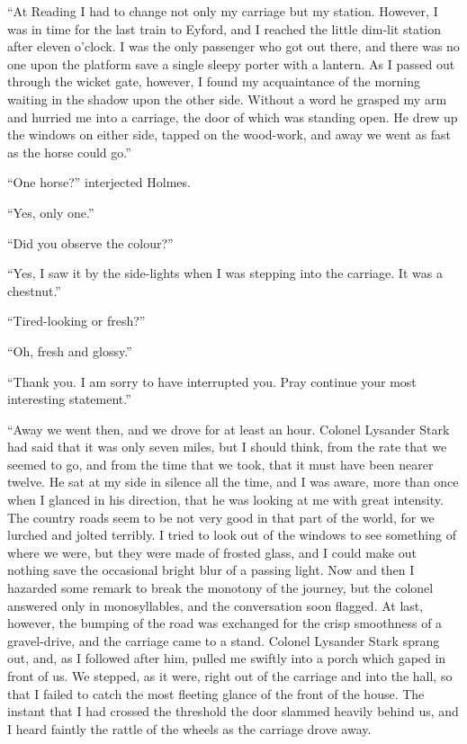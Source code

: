 \documentclass{article}
\begin{document}
``At Reading I had to change not only my carriage but my station. However,
I was in time for the last train to Eyford, and I reached the little
dim-lit station after eleven o'clock. I was the only passenger who got
out there, and there was no one upon the platform save a single sleepy
porter with a lantern. As I passed out through the wicket gate, however, I
found my acquaintance of the morning waiting in the shadow upon the other
side. Without a word he grasped my arm and hurried me into a carriage, the
door of which was standing open. He drew up the windows on either side,
tapped on the wood-work, and away we went as fast as the horse could go.''

``One horse?'' interjected Holmes.

``Yes, only one.''

``Did you observe the colour?''

``Yes, I saw it by the side-lights when I was stepping into the
carriage. It was a chestnut.''

``Tired-looking or fresh?''

``Oh, fresh and glossy.''

``Thank you. I am sorry to have interrupted you. Pray continue your most
interesting statement.''

``Away we went then, and we drove for at least an hour. Colonel Lysander
Stark had said that it was only seven miles, but I should think, from
the rate that we seemed to go, and from the time that we took, that
it must have been nearer twelve. He sat at my side in silence all the
time, and I was aware, more than once when I glanced in his direction,
that he was looking at me with great intensity. The country roads
seem to be not very good in that part of the world, for we lurched and
jolted terribly. I tried to look out of the windows to see something of
where we were, but they were made of frosted glass, and I could make
out nothing save the occasional bright blur of a passing light. Now
and then I hazarded some remark to break the monotony of the journey,
but the colonel answered only in monosyllables, and the conversation
soon flagged. At last, however, the bumping of the road was exchanged
for the crisp smoothness of a gravel-drive, and the carriage came to a
stand. Colonel Lysander Stark sprang out, and, as I followed after him,
pulled me swiftly into a porch which gaped in front of us. We stepped,
as it were, right out of the carriage and into the hall, so that I failed
to catch the most fleeting glance of the front of the house. The instant
that I had crossed the threshold the door slammed heavily behind us,
and I heard faintly the rattle of the wheels as the carriage drove away.
\end{document}
